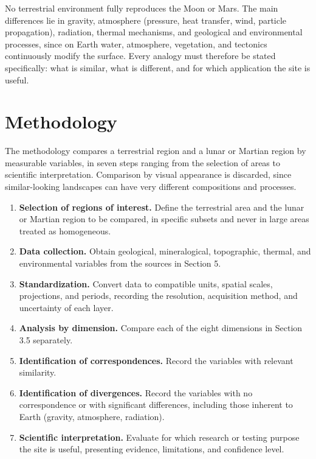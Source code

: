 \documentclass[12pt,letterpaper]{article}
\begin{document}
No terrestrial environment fully reproduces the Moon or Mars. The main differences lie in gravity, atmosphere (pressure, heat transfer, wind, particle propagation), radiation, thermal mechanisms, and geological and environmental processes, since on Earth water, atmosphere, vegetation, and tectonics continuously modify the surface. Every analogy must therefore be stated specifically: what is similar, what is different, and for which application the site is useful.

\section{Methodology}

The methodology compares a terrestrial region and a lunar or Martian region by measurable variables, in seven steps ranging from the selection of areas to scientific interpretation. Comparison by visual appearance is discarded, since similar-looking landscapes can have very different compositions and processes.

\begin{enumerate}
  \item \textbf{Selection of regions of interest.} Define the terrestrial area and the lunar or Martian region to be compared, in specific subsets and never in large areas treated as homogeneous.
  \item \textbf{Data collection.} Obtain geological, mineralogical, topographic, thermal, and environmental variables from the sources in Section 5.
  \item \textbf{Standardization.} Convert data to compatible units, spatial scales, projections, and periods, recording the resolution, acquisition method, and uncertainty of each layer.
  \item \textbf{Analysis by dimension.} Compare each of the eight dimensions in Section 3.5 separately.
  \item \textbf{Identification of correspondences.} Record the variables with relevant similarity.
  \item \textbf{Identification of divergences.} Record the variables with no correspondence or with significant differences, including those inherent to Earth (gravity, atmosphere, radiation).
  \item \textbf{Scientific interpretation.} Evaluate for which research or testing purpose the site is useful, presenting evidence, limitations, and confidence level.
\end{enumerate}
\end{document}
